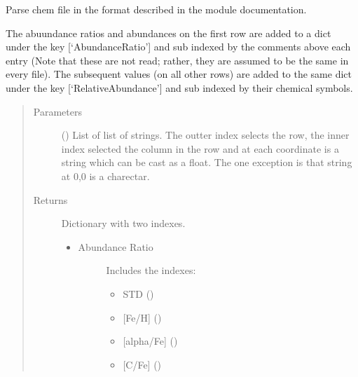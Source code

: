 \documentclass[letterpaper,10pt,english]{sphinxmanual}
\begin{document}
\begin{fulllineitems}
\label{\detokenize{pyTOPSScrape.parse:pyTOPSScrape.parse.abundance.parse}}
\sphinxAtStartPar
Parse chem file in the format described in the module documentation.

\sphinxAtStartPar
The abuundance ratios and abundances on the first row are added to a dict
under the key {[}‘AbundanceRatio’{]} and sub indexed by the comments above each
entry (Note that these are not read; rather, they are assumed to be the
same in every file). The subsequent values (on all other rows) are added to
the same dict under the key {[}‘RelativeAbundance’{]} and sub indexed by their
chemical symbols.
\begin{quote}\begin{description}
\item[{Parameters}] \leavevmode
\sphinxAtStartPar
{} () \textendash{} List of list of strings. The outter index selects the row, the
inner index selected the column in the row and at each coordinate
is a string which can be cast as a float. The one exception is that
string at 0,0 is a charectar.

\item[{Returns}] \leavevmode
\sphinxAtStartPar

\sphinxAtStartPar
{} \textendash{}

\sphinxAtStartPar
Dictionary with two indexes.
\begin{itemize}
\item {} \begin{description}
\item[{Abundance Ratio}] \leavevmode
\sphinxAtStartPar
Includes the indexes:
\begin{itemize}
\item {} 
\sphinxAtStartPar
STD ()

\item {} 
\sphinxAtStartPar
{[}Fe/H{]} ()

\item {} 
\sphinxAtStartPar
{[}alpha/Fe{]} ()

\item {} 
\sphinxAtStartPar
{[}C/Fe{]} ()


\end{itemize}
\end{description}
\end{itemize}
\end{description}
\end{quote}
\end{fulllineitems}
\end{document}
